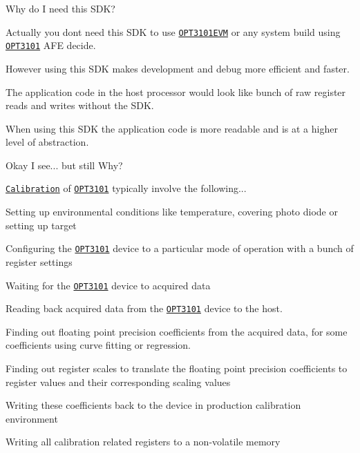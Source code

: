 \begin{DoxyEnumerate}
\item Why do I need this S\+DK?
\begin{DoxyItemize}
\item Actually you don\textquotesingle{}t need this S\+DK to use \href{http://www.ti.com/tool/OPT3101EVM}{\tt O\+P\+T3101\+E\+VM} or any system build using \href{http://www.ti.com/product/OPT3101}{\tt O\+P\+T3101} A\+FE decide.
\item However using this S\+DK makes development and debug more efficient and faster.
\item The application code in the host processor would look like bunch of raw register reads and writes without the S\+DK.
\item When using this S\+DK the application code is more readable and is at a higher level of abstraction.
\end{DoxyItemize}
\item Okay I see... but still Why?
\begin{DoxyItemize}
\item \href{http://www.ti.com/lit/ug/sbau310/sbau310.pdf}{\tt Calibration} of \href{http://www.ti.com/product/OPT3101}{\tt O\+P\+T3101} typically involve the following...
\begin{DoxyItemize}
\item Setting up environmental conditions like temperature, covering photo diode or setting up target
\item Configuring the \href{http://www.ti.com/product/OPT3101}{\tt O\+P\+T3101} device to a particular mode of operation with a bunch of register settings
\item Waiting for the \href{http://www.ti.com/product/OPT3101}{\tt O\+P\+T3101} device to acquired data
\item Reading back acquired data from the \href{http://www.ti.com/product/OPT3101}{\tt O\+P\+T3101} device to the host.
\item Finding out floating point precision coefficients from the acquired data, for some coefficients using curve fitting or regression.
\item Finding out register scales to translate the floating point precision coefficients to register values and their corresponding scaling values
\item Writing these coefficients back to the device in production calibration environment
\item Writing all calibration related registers to a non-\/volatile memory

\end{DoxyItemize}
\end{DoxyItemize}
\end{DoxyEnumerate}
